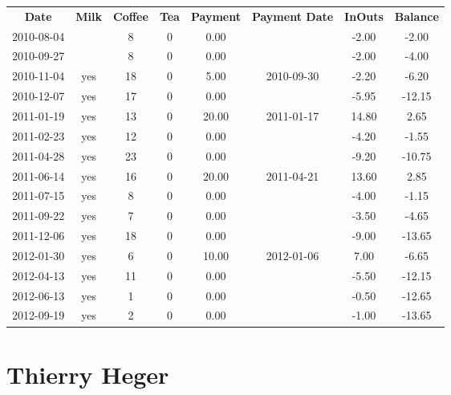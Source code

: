 \begin{center}
\begin{tabular}{cccccccc}
\textbf{Date} & \textbf{Milk} & \textbf{Coffee} & \textbf{Tea} & \textbf{Payment} & \textbf{Payment Date} & \textbf{InOuts} & \textbf{Balance} \\
2010-08-04 &  &  8 & 0 &  0.00 &  & -2.00 &  -2.00\\ 
2010-09-27 &  &  8 & 0 &  0.00 &  & -2.00 &  -4.00\\ 
2010-11-04 & yes & 18 & 0 &  5.00 & 2010-09-30 & -2.20 &  -6.20\\ 
2010-12-07 & yes & 17 & 0 &  0.00 &  & -5.95 & -12.15\\ 
2011-01-19 & yes & 13 & 0 & 20.00 & 2011-01-17 & 14.80 &   2.65\\ 
2011-02-23 & yes & 12 & 0 &  0.00 &  & -4.20 &  -1.55\\ 
2011-04-28 & yes & 23 & 0 &  0.00 &  & -9.20 & -10.75\\ 
2011-06-14 & yes & 16 & 0 & 20.00 & 2011-04-21 & 13.60 &   2.85\\ 
2011-07-15 & yes &  8 & 0 &  0.00 &  & -4.00 &  -1.15\\ 
2011-09-22 & yes &  7 & 0 &  0.00 &  & -3.50 &  -4.65\\ 
2011-12-06 & yes & 18 & 0 &  0.00 &  & -9.00 & -13.65\\ 
2012-01-30 & yes &  6 & 0 & 10.00 & 2012-01-06 &  7.00 &  -6.65\\ 
2012-04-13 & yes & 11 & 0 &  0.00 &  & -5.50 & -12.15\\ 
2012-06-13 & yes &  1 & 0 &  0.00 &  & -0.50 & -12.65\\ 
2012-09-19 & yes &  2 & 0 &  0.00 &  & -1.00 & -13.65
\end{tabular}
\end{center}

\section{Thierry Heger}

